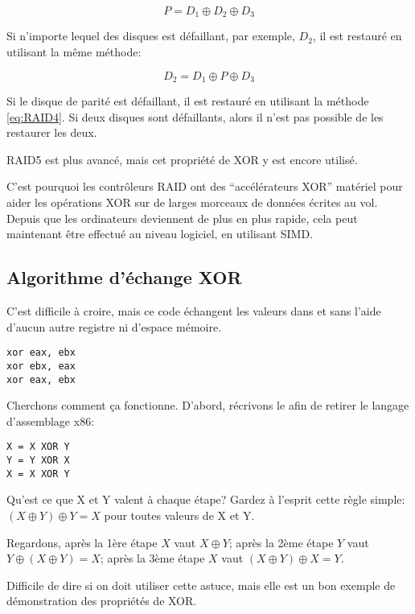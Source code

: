 \begin{equation} \label{eq:RAID4}
P = D_1 \oplus D_2 \oplus D_3
\end{equation}

Si n'importe lequel des disques est défaillant, par exemple, $D_2$, il est restauré
en utilisant la même méthode:

\begin{equation}
D_2 = D_1 \oplus P \oplus D_3
\end{equation}

Si le disque de parité est défaillant, il est restauré en utilisant la méthode \ref{eq:RAID4}.
Si deux disques sont défaillants, alors il n'est pas possible de les restaurer les
deux.

\ac{RAID}5 est plus avancé, mais cet propriété de XOR y est encore utilisé.

C'est pourquoi les contrôleurs \ac{RAID} ont des ``accélérateurs XOR'' matériel
pour aider les opérations XOR sur de larges morceaux de données écrites au vol.
Depuis que les ordinateurs deviennent de plus en plus rapide, cela peut maintenant
être effectué au niveau logiciel, en utilisant \ac{SIMD}.

\subsection{Algorithme d'échange XOR}

C'est difficile à croire, mais ce code échangent les valeurs dans \EAX et \EBX sans
l'aide d'aucun autre registre ni d'espace mémoire.

\begin{lstlisting}[style=customasmx86]
xor eax, ebx
xor ebx, eax
xor eax, ebx
\end{lstlisting}

Cherchons comment ça fonctionne.
D'abord, récrivons le afin de retirer le langage d'assemblage x86:

\begin{lstlisting}
X = X XOR Y
Y = Y XOR X
X = X XOR Y
\end{lstlisting}

Qu'est ce que X et Y valent à chaque étape?
Gardez à l'esprit cette règle simple: $(X \oplus Y) \oplus Y = X$ pour toutes valeurs
de X et Y.

Regardons,
après la 1ère étape $X$ vaut $X \oplus Y$;
après la 2ème étape $Y$ vaut $Y \oplus (X \oplus Y) = X$;
après la 3ème étape $X$ vaut $(X \oplus Y) \oplus X = Y$.

Difficile de dire si on doit utiliser cette astuce, mais elle est un bon exemple de
démonstration des propriétés de XOR.


